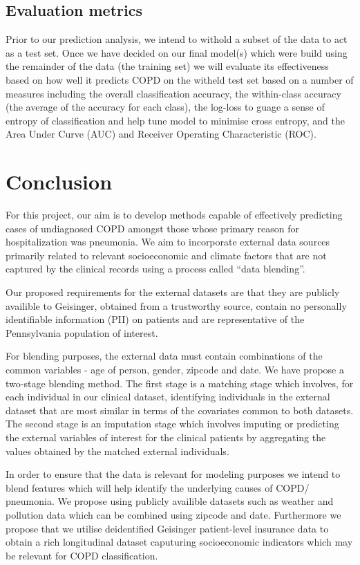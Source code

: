 \documentclass{article}
\begin{document}
\subsection{Evaluation metrics}
Prior to our prediction analysis, we intend to withold a subset of the data to act as a test set. Once we have decided on our final model(s) which were build using the remainder of the data (the training set) we will evaluate its effectiveness based on how well it predicts COPD on the witheld test set based on a number of measures including the overall classification accuracy, the within-class accuracy (the average of the accuracy for each class), the log-loss to guage a sense of entropy of classification and help tune model to minimise cross entropy, and the Area Under Curve (AUC) and Receiver Operating Characteristic (ROC).



\section{Conclusion}
For this project, our aim is to develop methods capable of effectively 
predicting cases of undiagnosed COPD amongst those whose primary reason for 
hospitalization was pneumonia. We aim to incorporate external data sources 
primarily related to relevant socioeconomic and climate factors that 
are not captured by the clinical records using a process called ``data blending''.

Our proposed requirements for the external datasets are that they are publicly
availible to Geisinger, obtained from a trustworthy source, contain no personally 
identifiable information (PII) on patients and are representative of the 
Pennsylvania population of interest.

For blending purposes, the external data must contain combinations of the common
variables - age of person, gender, zipcode and date. We have propose a two-stage 
blending method. The first stage is a matching stage which involves, for each 
individual in our clinical dataset, identifying individuals in the external 
dataset that are most similar in terms of the covariates common to both datasets. 
The second stage is an imputation stage which involves imputing or predicting 
the external variables of interest for the clinical patients by aggregating the 
values obtained by the matched external individuals.

In order to ensure that the data is relevant for modeling purposes we intend to 
blend features which will help identify the underlying causes of COPD/ pneumonia. 
We propose using publicly availible datasets such as weather and pollution data 
which can be combined using zipcode and date. Furthermore we propose that we utilise
deidentified Geisinger patient-level insurance data to obtain a rich longitudinal dataset    
caputuring socioeconomic indicators which may be relevant for COPD classification.
\end{document}
